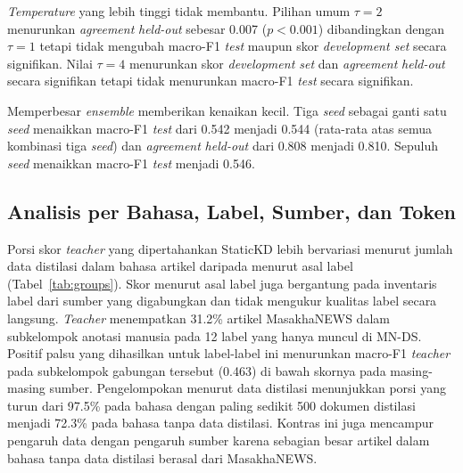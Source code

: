 \documentclass{ieeeaccess}
\newcommand{\en}[1]{\textit{#1}}
\begin{document}
\en{Temperature} yang lebih tinggi tidak membantu. Pilihan umum $\tau=2$~\cite{hinton2015distilling} menurunkan \en{agreement} \en{held-out} sebesar 0.007 ($p<0.001$) dibandingkan dengan $\tau=1$ tetapi tidak mengubah macro-F1 \en{test} maupun skor \en{development set} secara signifikan. Nilai $\tau=4$ menurunkan skor \en{development set} dan \en{agreement} \en{held-out} secara signifikan tetapi tidak menurunkan macro-F1 \en{test} secara signifikan.

Memperbesar \en{ensemble} memberikan kenaikan kecil. Tiga \en{seed} sebagai ganti satu \en{seed} menaikkan macro-F1 \en{test} dari 0.542 menjadi 0.544 (rata-rata atas semua kombinasi tiga \en{seed}) dan \en{agreement} \en{held-out} dari 0.808 menjadi 0.810. Sepuluh \en{seed} menaikkan macro-F1 \en{test} menjadi 0.546.

\subsection{Analisis per Bahasa, Label, Sumber, dan Token}
\label{sec:res-lang}
Porsi skor \en{teacher} yang dipertahankan StaticKD lebih bervariasi menurut jumlah data distilasi dalam bahasa artikel daripada menurut asal label (Tabel~\ref{tab:groups}). Skor menurut asal label juga bergantung pada inventaris label dari sumber yang digabungkan dan tidak mengukur kualitas label secara langsung. \en{Teacher} menempatkan 31.2\% artikel MasakhaNEWS dalam subkelompok anotasi manusia pada 12 label yang hanya muncul di MN-DS. Positif palsu yang dihasilkan untuk label-label ini menurunkan macro-F1 \en{teacher} pada subkelompok gabungan tersebut (0.463) di bawah skornya pada masing-masing sumber. Pengelompokan menurut data distilasi menunjukkan porsi yang turun dari 97.5\% pada bahasa dengan paling sedikit 500 dokumen distilasi menjadi 72.3\% pada bahasa tanpa data distilasi. Kontras ini juga mencampur pengaruh data dengan pengaruh sumber karena sebagian besar artikel dalam bahasa tanpa data distilasi berasal dari MasakhaNEWS.
\end{document}

